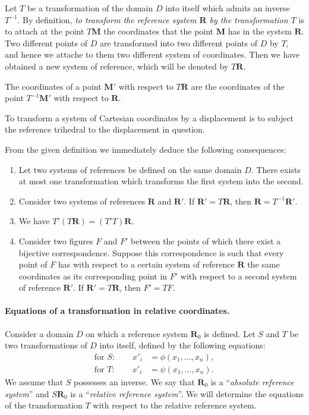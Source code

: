 Let $T$ be a transformation of the domain $D$ into itself which admits an inverse $T^{-1}$. By definition, \emph{to transform the reference system $\mathbf{R}$ by the transformation $T$} is to attach at the point $T\mathbf{M}$ the coordinates that the point $\mathbf{M}$ has in the system $\mathbf{R}$. Two different points of $D$ are transformed into two different points of $D$ by $T$, and hence we attache to them two different system of coordinates. Then we have obtained a new system of reference, which will be denoted by $T\mathbf{R}$.

\begin{rmk}
  The coordinates of a point $\mathbf{M}'$ with respect to $T\mathbf{R}$ are the coordinates of the point $T^{-1}\mathbf{M}'$ with respect to $\mathbf{R}$.
\end{rmk}

\begin{ex}
  To transform a system of Cartesian coordinates by a displacement is to subject the reference trihedral to the displacement in question.
\end{ex}

From the given definition we immediately deduce the following consequences:
\begin{enumerate}[\itshape a.]
\item Let two systems of references be defined on the same domain $D$. There exists at most one transformation which transforms the first system into the second.
\item Consider two systems of references $\mathbf{R}$ and $\mathbf{R}'$. If $\mathbf{R}'=T\mathbf{R}$, then $\mathbf{R}=T^{-1}\mathbf{R}'$.
\item We have $T'(T\mathbf{R})=(T'T)\mathbf{R}$.
\item Consider two figures $F$ and $F'$ between the points of which there exist a bijective correspondence. Suppose this correspondence is such that every point of $F$ has with respect to a certain system of reference $\mathbf{R}$ the same coordinates as its corresponding point in $F'$ with respect to a second system of reference $\mathbf{R}'$. If $\mathbf{R}'=T\mathbf{R}$, then $F'=TF$.
\end{enumerate}

\paragraph{Equations of a transformation in relative coordinates.}
\label{sec:62}
Consider a domain $D$ on which a reference system $\mathbf{R}_{0}$ is defined. Let $S$ and $T$ be two transformations of $D$ into itself, defined by the following equations:
\begin{align*}
  \text{for }S:\qquad x'_{i}&=\phi(x_{1},\dots,x_{n}),\\
  \text{for }T:\qquad x'_{i}&=\psi(x_{1},\dots,x_{n}).
\end{align*}
We assume that $S$ possesses an inverse. We say that $\mathbf{R}_{0}$ is a ``\emph{absolute reference system}'' and $S\mathbf{R}_{0}$ is a ``\emph{relative reference system}''. We will determine the equations of the transformation $T$ with respect to the relative reference system.

